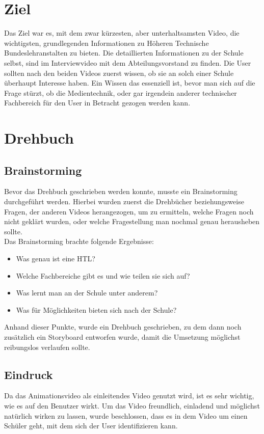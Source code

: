 \section{Ziel}
\renewcommand{\kapitelautor}{Autor: Niklas Kienreich}
Das Ziel war es, mit dem zwar kürzesten, aber unterhaltsamsten Video, die wichtigsten, grundlegenden Informationen zu Höheren Technische Bundeslehranstalten zu bieten. Die detaillierten Informationen zu der Schule selbst, sind im Interviewvideo mit dem Abteilungsvorstand zu finden. Die User sollten nach den beiden Videos zuerst wissen, ob sie an solch einer Schule überhaupt Interesse haben. Ein Wissen das essenziell ist, bevor man sich auf die Frage stürzt, ob die Medientechnik, oder gar irgendein anderer technischer Fachbereich für den User in Betracht gezogen werden kann.
\section{Drehbuch}
\subsection{Brainstorming}
Bevor das Drehbuch geschrieben werden konnte, musste ein Brainstorming durchgeführt werden. Hierbei wurden zuerst die Drehbücher beziehungsweise Fragen, der anderen Videos herangezogen, um zu ermitteln, welche Fragen noch nicht geklärt wurden, oder welche Fragestellung man nochmal genau herausheben sollte.
\leavevmode \\
Das Brainstorming brachte folgende Ergebnisse:
\begin{itemize}
\item Was genau ist eine HTL?
\item Welche Fachbereiche gibt es und wie teilen sie sich auf?
\item Was lernt man an der Schule unter anderem?
\item Was für Möglichkeiten bieten sich nach der Schule?
\end{itemize}
Anhand dieser Punkte, wurde ein Drehbuch geschrieben, zu dem dann noch zusätzlich ein Storyboard entworfen wurde, damit die Umsetzung möglichst reibungslos verlaufen sollte.
\subsection{Eindruck}
Da das Animationsvideo als einleitendes Video genutzt wird, ist es sehr wichtig, wie es auf den Benutzer wirkt. Um das Video freundlich, einladend und möglichst natürlich wirken zu lassen, wurde beschlossen, dass es in dem Video um einen Schüler geht, mit dem sich der User identifizieren kann.
